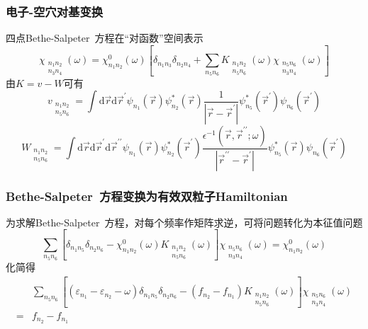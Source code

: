 \documentclass[cjk,slidestop,compress,mathserif,blue]{beamer}
\begin{document}
\frame
{
	\frametitle{电子-空穴对基变换}
	四点\textrm{Bethe-Salpeter~}方程在“对函数”空间表示
	\begin{displaymath}
		\chi_{ \substack{ n_1 n_2\\n_3 n_4 } }
		(\omega)=\chi_{n_1n_2}^0(\omega)\left[ \delta_{n_1n_3}\delta_{n_2n_4}+\sum_{n_5n_6}K_{
			\substack{	n_1 n_2\\ n_5 n_6 } }
			(\omega)\chi_{
				\substack{ n_5 n_6\\ n_3 n_4 } }(\omega)
			\right]
	\end{displaymath}
	由$K=v-W$可有
	\begin{displaymath}
		v_{
			\substack{ n_1 n_2\\ n_5 n_6 } }
			=\int\mathrm{d}\vec r\mathrm{d}\vec r^{\prime}\psi_{n_1}(\vec r)\psi_{n_2}^{\ast}(\vec r)\frac1{|\vec r-\vec r^{\prime}|}\psi_{n_5}^{\ast}(\vec r^{\prime})\psi_{n_6}(\vec r^{\prime})
	\end{displaymath}
	\begin{displaymath}
		W_{
			\substack{
				n_1 n_2\\
				n_5 n_6
			} }=\int\mathrm{d}\vec r\mathrm{d}\vec r^{\prime}\mathrm{d}\vec r^{\prime\prime}\psi_{n_1}(\vec r)\psi_{n_2}^{\ast}(\vec r^{\prime})\frac{\epsilon^{-1}(\vec r,\vec r^{\prime\prime};\omega)}{|\vec r^{\prime\prime}-\vec r^{\prime}|}\psi_{n_5}^{\ast}(\vec r)\psi_{n_6}(\vec r^{\prime})
	\end{displaymath}
}

\frame
{
	\frametitle{\textrm{Bethe-Salpeter~}方程变换为有效双粒子\textrm{Hamiltonian}}
	为求解\textrm{Bethe-Salpeter~}方程，对每个频率作矩阵求逆，可将问题转化为本征值问题
	\begin{displaymath}
		\sum_{n_5n_6}\left[ \delta_{n_1n_5}\delta_{n_2n_6}-\chi_{n_1n_2}^0(\omega)K_{
			\substack{
				n_1 n_2\\
				n_5 n_6
			} }
			(\omega)
			\right]\chi_{ \substack{
			n_5 n_6\\n_3 n_4 
		} }
		(\omega)=\chi_{n_1n_2}^0(\omega)
	\end{displaymath}
	\vskip 20pt
	化简得
	\begin{displaymath}
		\begin{aligned}
			&\sum_{n_5n_6}\left[ (\varepsilon_{n_1}-\varepsilon_{n_2}-\omega)\delta_{n_1n_5}\delta_{n_2n_6}-(f_{n_2}-f_{n_1})K_{
			\substack{
				n_1 n_2\\
				n_5 n_6
			} }
			(\omega)
			\right]\chi_{ \substack{
			n_5 n_6\\n_3 n_4 
		} }
		(\omega)\\
		=&f_{n_2}-f_{n_1}
		\end{aligned}
	\end{displaymath}
}
\end{document}
